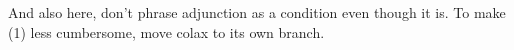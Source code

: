 And also here, don't phrase adjunction as a condition even though it is.
To make (1) less cumbersome, move colax to its own branch.

